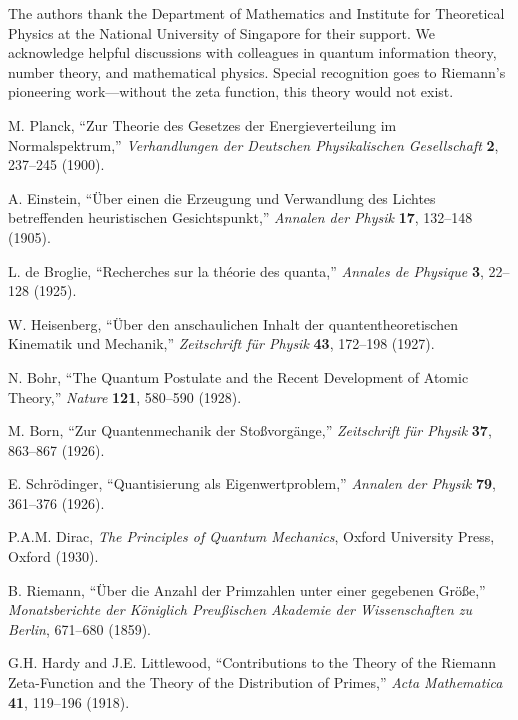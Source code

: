 \documentclass[11pt]{article}
\theoremstyle{plain}
\theoremstyle{definition}
\theoremstyle{remark}
\begin{document}
The authors thank the Department of Mathematics and Institute for Theoretical Physics at the National University of Singapore for their support. We acknowledge helpful discussions with colleagues in quantum information theory, number theory, and mathematical physics. Special recognition goes to Riemann's pioneering work—without the zeta function, this theory would not exist.



\begin{thebibliography}{99}

 M. Planck, ``Zur Theorie des Gesetzes der Energieverteilung im Normalspektrum,'' \emph{Verhandlungen der Deutschen Physikalischen Gesellschaft} \textbf{2}, 237--245 (1900).

 A. Einstein, ``Über einen die Erzeugung und Verwandlung des Lichtes betreffenden heuristischen Gesichtspunkt,'' \emph{Annalen der Physik} \textbf{17}, 132--148 (1905).

 L. de Broglie, ``Recherches sur la théorie des quanta,'' \emph{Annales de Physique} \textbf{3}, 22--128 (1925).

 W. Heisenberg, ``Über den anschaulichen Inhalt der quantentheoretischen Kinematik und Mechanik,'' \emph{Zeitschrift für Physik} \textbf{43}, 172--198 (1927).

 N. Bohr, ``The Quantum Postulate and the Recent Development of Atomic Theory,'' \emph{Nature} \textbf{121}, 580--590 (1928).

 M. Born, ``Zur Quantenmechanik der Stoßvorgänge,'' \emph{Zeitschrift für Physik} \textbf{37}, 863--867 (1926).

 E. Schrödinger, ``Quantisierung als Eigenwertproblem,'' \emph{Annalen der Physik} \textbf{79}, 361--376 (1926).

 P.A.M. Dirac, \emph{The Principles of Quantum Mechanics}, Oxford University Press, Oxford (1930).

 B. Riemann, ``Über die Anzahl der Primzahlen unter einer gegebenen Größe,'' \emph{Monatsberichte der Königlich Preußischen Akademie der Wissenschaften zu Berlin}, 671--680 (1859).

 G.H. Hardy and J.E. Littlewood, ``Contributions to the Theory of the Riemann Zeta-Function and the Theory of the Distribution of Primes,'' \emph{Acta Mathematica} \textbf{41}, 119--196 (1918).


\end{thebibliography}
\end{document}
